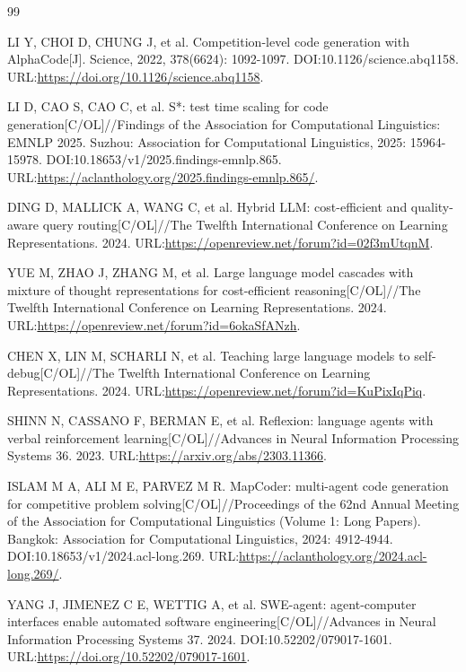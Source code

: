 ﻿\begin{thebibliography}{99}

LI Y, CHOI D, CHUNG J, et al.
Competition-level code generation with AlphaCode[J].
Science, 2022, 378(6624): 1092-1097.
DOI:10.1126/science.abq1158.
URL:\url{https://doi.org/10.1126/science.abq1158}.

LI D, CAO S, CAO C, et al.
S*: test time scaling for code generation[C/OL]//Findings of the Association for Computational Linguistics: EMNLP 2025.
Suzhou: Association for Computational Linguistics, 2025: 15964-15978.
DOI:10.18653/v1/2025.findings-emnlp.865.
URL:\url{https://aclanthology.org/2025.findings-emnlp.865/}.

DING D, MALLICK A, WANG C, et al.
Hybrid LLM: cost-efficient and quality-aware query routing[C/OL]//The Twelfth International Conference on Learning Representations.
2024.
URL:\url{https://openreview.net/forum?id=02f3mUtqnM}.

YUE M, ZHAO J, ZHANG M, et al.
Large language model cascades with mixture of thought representations for cost-efficient reasoning[C/OL]//The Twelfth International Conference on Learning Representations.
2024.
URL:\url{https://openreview.net/forum?id=6okaSfANzh}.

CHEN X, LIN M, SCHARLI N, et al.
Teaching large language models to self-debug[C/OL]//The Twelfth International Conference on Learning Representations.
2024.
URL:\url{https://openreview.net/forum?id=KuPixIqPiq}.

SHINN N, CASSANO F, BERMAN E, et al.
Reflexion: language agents with verbal reinforcement learning[C/OL]//Advances in Neural Information Processing Systems 36.
2023.
URL:\url{https://arxiv.org/abs/2303.11366}.

ISLAM M A, ALI M E, PARVEZ M R.
MapCoder: multi-agent code generation for competitive problem solving[C/OL]//Proceedings of the 62nd Annual Meeting of the Association for Computational Linguistics (Volume 1: Long Papers).
Bangkok: Association for Computational Linguistics, 2024: 4912-4944.
DOI:10.18653/v1/2024.acl-long.269.
URL:\url{https://aclanthology.org/2024.acl-long.269/}.

YANG J, JIMENEZ C E, WETTIG A, et al.
SWE-agent: agent-computer interfaces enable automated software engineering[C/OL]//Advances in Neural Information Processing Systems 37.
2024.
DOI:10.52202/079017-1601.
URL:\url{https://doi.org/10.52202/079017-1601}.


\end{thebibliography}
